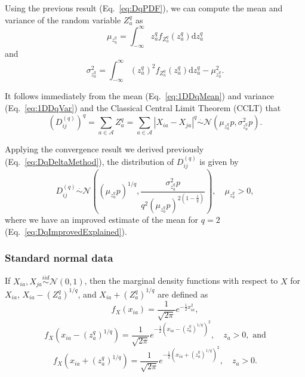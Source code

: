 \documentclass[10pt,letterpaper]{article}
\begin{document}
Using the previous result (Eq.~\ref{eq:DqPDF}), we can compute the mean and variance of the random variable $Z^q_a$ as
%
\begin{equation}\label{eq:1DDqMean}
\mu_{z^q_a} = \int_{-\infty}^{\infty} z^q_a f_{Z^q_a}(z^q_a) \text{d}z^q_a
\end{equation}
%
and 
%
\begin{equation}\label{eq:1DDqVar}
\sigma^2_{z^q_a} = \int_{-\infty}^{\infty} \left(z^q_a\right)^2 f_{Z^q_a}(z^q_a) \text{d}z^q_a - \mu^2_{z^q_a}.
\end{equation}

It follows immediately from the mean (Eq.~\ref{eq:1DDqMean}) and variance (Eq.~\ref{eq:1DDqVar}) and the Classical Central Limit Theorem (CCLT) that
%
\begin{equation}\label{eq:DqDistr}
\left(D^{(q)}_{ij}\right)^q = \sum_{a \in \mathcal{A}} Z^q_a = \sum_{a \in \mathcal{A}} |X_{ia} - X_{ja}|^q \overset{.}{\sim} \mathcal{N}\left(\mu_{z^q_a}p,\sigma^2_{z^q_a}p\right).
\end{equation}

Applying the convergence result we derived previously (Eq.~\ref{eq:DqDeltaMethod}), the distribution of $D^{(q)}_{ij}$ is given by
%
\begin{equation}\label{eq:DDistr}
D^{(q)}_{ij} \overset{.}{\sim} \mathcal{N}\left(\left(\mu_{z^q_a}p\right)^{1/q},\frac{\sigma^2_{z^q_a}p}{q^2\left(\mu_{z^q_a}p\right)^{2\left(1 - \frac{1}{q}\right)}}\right), \quad \mu_{z^q_a} > 0,
\end{equation}
%
where we have an improved estimate of the mean for $q=2$ (Eq.~\ref{eq:DqImprovedExplained}).

\subsubsection{Standard normal data}

If $X_{ia},X_{ja} \overset{iid}{\sim} \mathcal{N}(0,1)$, then the marginal density functions with respect to $X$ for $X_{ia}$, $X_{ia} - \left(Z^q_a\right)^{1/q}$, and $X_{ia} + \left(Z^q_a\right)^{1/q}$ are defined as
%
\begin{equation}\label{eq:normalXmarg}
f_X(x_{ia}) = \frac{1}{\sqrt{2\pi}}e^{-\frac{1}{2}x^2_{ia}},
\end{equation}
%
\begin{equation}\label{eq:normalXMinusZmarg}
f_X\left(x_{ia} - \left(z^q_a\right)^{1/q}\right) = \frac{1}{\sqrt{2\pi}}e^{-\frac{1}{2}\left(x_{ia} - \left(z^q_a\right)^{1/q}\right)^2}, \quad z_a > 0, \text{ and}
\end{equation}
%
\begin{equation}\label{eq:normalXPlusZmarg}
f_X\left(x_{ia} + \left(z^q_a\right)^{1/q}\right) = \frac{1}{\sqrt{2\pi}}e^{-\frac{1}{2}\left(x_{ia} + \left(z^q_a\right)^{1/q}\right)^2}, \quad z_a > 0.
\end{equation}
\end{document}
